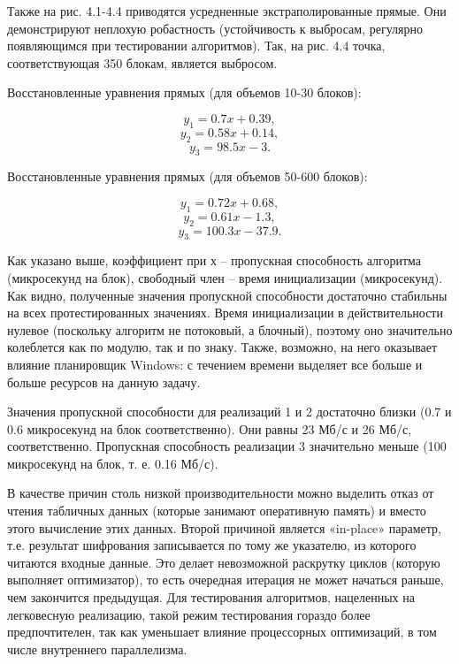 Также на рис. 4.1-4.4 приводятся усредненные экстраполированные прямые. Они демонстрируют неплохую робастность (устойчивость к выбросам, регулярно появляющимся при тестировании алгоритмов). Так, на рис. 4.4 точка, соответствующая 350 блокам, является выбросом.

Восстановленные уравнения прямых (для объемов 10-30 блоков):

\begin{equation}
y_1 = 0.7x + 0.39,
\end{equation}
\begin{equation}
y_2 = 0.58x + 0.14,
\end{equation}
\begin{equation}
y_3 = 98.5x - 3.
\end{equation}

Восстановленные уравнения прямых (для объемов 50-600 блоков):

\begin{equation}
y_1 = 0.72x + 0.68,
\end{equation}
\begin{equation}
y_2 = 0.61x - 1.3,
\end{equation}
\begin{equation}
y_3 = 100.3x - 37.9.
\end{equation}

Как указано выше, коэффициент при х – пропускная способность алгоритма (микросекунд на блок), свободный член – время инициализации (микросекунд). Как видно, полученные значения пропускной способности достаточно стабильны на всех протестированных значениях. Время инициализации в действительности нулевое (поскольку алгоритм не потоковый, а блочный), поэтому оно значительно колеблется как по модулю, так и по знаку. Также, возможно, на него оказывает влияние планировщик Windows: с течением времени выделяет все больше и больше ресурсов на данную задачу.

Значения пропускной способности для реализаций 1 и 2 достаточно близки (0.7 и 0.6 микросекунд на блок соответственно). Они равны 23 Мб/с и 26 Мб/с, соответственно. Пропускная способность реализации 3 значительно меньше (100 микросекунд на блок, т. е. 0.16 Мб/с).

В качестве причин столь низкой производительности можно выделить отказ от чтения табличных данных (которые занимают оперативную память) и вместо этого вычисление этих данных. Второй причиной является «in-place» параметр, т.е. результат шифрования записывается по тому же указателю, из которого читаются входные данные. Это делает невозможной раскрутку циклов (которую выполняет оптимизатор), то есть очередная итерация не может начаться раньше, чем закончится предыдущая. Для тестирования алгоритмов, нацеленных на легковесную реализацию, такой режим тестирования гораздо более предпочтителен, так как уменьшает влияние процессорных оптимизаций, в том числе внутреннего параллелизма.

